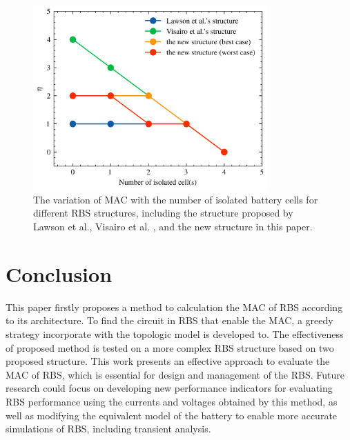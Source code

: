 \documentclass{article}
\begin{document}
\begin{figure}[htbp]
    \centering
    \includegraphics[width=0.8\textwidth]{../attachments/isolated_mac.png}
    \caption{
        The variation of MAC with the number of isolated battery cells for different RBS structures, including the structure proposed by Lawson et al., Visairo et al. , and the new structure in this paper.
    }\label{fig:isolated_mac}
\end{figure}

\section{Conclusion}

This paper firstly proposes a method to calculation the MAC of RBS according to its architecture. 
To find the circuit in RBS that enable the MAC, a greedy strategy incorporate with the topologic model is developed to. 
The effectiveness of proposed method is tested on a more complex RBS structure based on two proposed structure.
This work presents an effective approach to evaluate the MAC of RBS, which is essential for design and management of the RBS. 
Future research could focus on developing new performance indicators for evaluating RBS performance using the currents and voltages obtained by this method, as well as modifying the equivalent model of the battery to enable more accurate simulations of RBS, including transient analysis.
\end{document}
